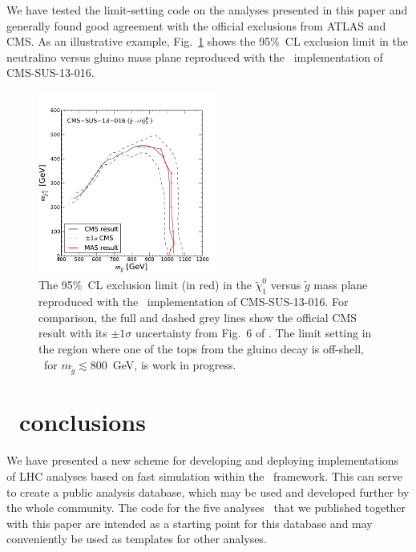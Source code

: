 We have tested the limit-setting code on the analyses presented in this paper and generally found good agreement with the official exclusions from ATLAS and CMS.
As an illustrative example, Fig.~\ref{fig:cms-016-limit} shows the 95\%~CL exclusion limit in the neutralino versus gluino mass plane reproduced with the \ma\ implementation \cite{MA5-CMS-SUS-13-016}  of CMS-SUS-13-016.  

\begin{figure}[!h]\centering
\includegraphics[width=6cm]{figures/madanalysis5/cms-016-limit.pdf}
\caption{The 95\%~CL exclusion limit (in red) in the $\tilde\chi^0_1$ versus $\tilde g$ mass plane reproduced 
with the \ma\ implementation  \cite{MA5-CMS-SUS-13-016}  of CMS-SUS-13-016. For comparison, the full and dashed grey lines show the official CMS result with its $\pm1\sigma$ uncertainty from Fig.~6 of \cite{CMS:2013ija}. 
The limit setting in the region where one of the tops from the gluino decay is off-shell, \ie\ for $m_{\tilde g}\lesssim 800$~GeV, is work in progress.} 
\label{fig:cms-016-limit}
\end{figure}



\section{\ma\ conclusions}\label{sec:conclusions}


We have presented a new scheme for developing and deploying implementations of LHC analyses 
based on fast simulation within the \ma\ framework. This can serve to create a public analysis database,  
which may be used and developed further by the whole community.  
The code for the five analyses~\cite{MA5-CMS-SUS-13-011,MA5-CMS-SUS-13-012,MA5-CMS-SUS-13-016,MA5-ATLAS-SUSY-2013-05,MA5-ATLAS-SUSY-2013-11} 
that we published together with this paper are intended as a starting point 
for this database and may conveniently be used as templates for other analyses.  

